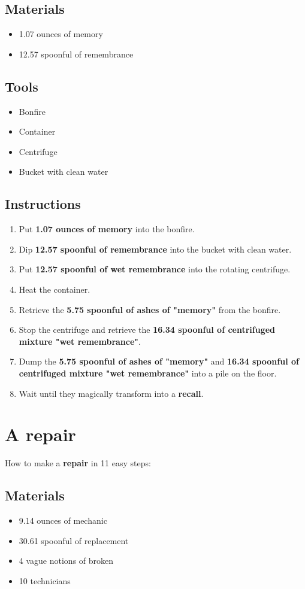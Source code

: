 \documentclass{article}
\begin{document}
\subsection{Materials}\begin{itemize}
\item 
1.07 ounces of memory
\item 
12.57 spoonful of remembrance
\end{itemize}
\subsection{Tools}\begin{itemize}
\item 
Bonfire
\item 
Container
\item 
Centrifuge
\item 
Bucket with clean water
\end{itemize}
\subsection{Instructions}\begin{enumerate}
\item 
Put \textbf{1.07 ounces of memory} into the bonfire.
\item 
Dip \textbf{12.57 spoonful of remembrance} into the bucket with clean water.
\item 
Put \textbf{12.57 spoonful of wet remembrance} into the rotating centrifuge.
\item 
Heat the container.
\item 
Retrieve the \textbf{5.75 spoonful of ashes of "memory"} from the bonfire.
\item 
Stop the centrifuge and retrieve the \textbf{16.34 spoonful of centrifuged mixture "wet remembrance"}.
\item 
Dump the \textbf{5.75 spoonful of ashes of "memory"} and \textbf{16.34 spoonful of centrifuged mixture "wet remembrance"} into a pile on the floor.
\item 
Wait until they magically transform into a \textbf{recall}.
\end{enumerate}
\newpage
\section{A repair}How to make a \textbf{repair} in 11 easy steps:

\subsection{Materials}\begin{itemize}
\item 
9.14 ounces of mechanic
\item 
30.61 spoonful of replacement
\item 
4 vague notions of broken
\item 
10 technicians
\end{itemize}
\end{document}
